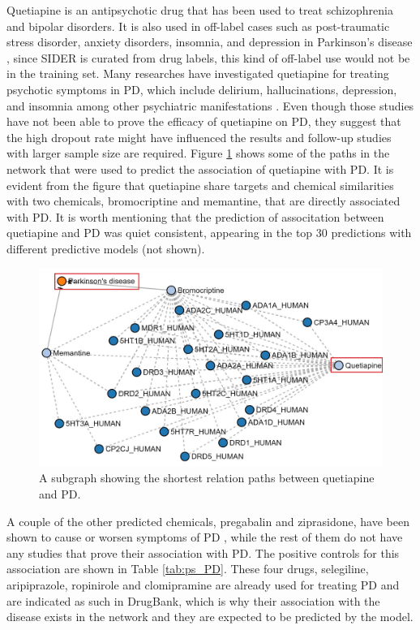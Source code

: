 Quetiapine is an antipsychotic drug that has been used to treat schizophrenia and bipolar disorders. It is also used in off-label cases such as post-traumatic stress disorder, anxiety disorders, insomnia, and depression in Parkinson’s disease \cite{el-saifi_quetiapine_2016}, since SIDER is curated from drug labels, this kind of off-label use would not be in the training set. Many researches have investigated quetiapine for treating psychotic symptoms in \ac{PD}, which include delirium, hallucinations, depression, and insomnia among other psychiatric manifestations \cite{desmarais_quetiapine_2016}. Even though those studies have not been able to prove the efficacy of quetiapine on \ac{PD}, they suggest that the high dropout rate might have influenced the results and follow-up studies with larger sample size are required. Figure \ref{fig:parkinson_quetiapine} shows some of the paths in the network that were used to predict the association of quetiapine with \ac{PD}. It is evident from the figure that quetiapine share targets and chemical similarities with two chemicals, bromocriptine and memantine, that are directly associated with \ac{PD}. It is worth mentioning that the prediction of associtation between quetiapine and \ac{PD} was quiet consistent, appearing in the top 30 predictions with different predictive models (not shown). 

\begin{figure}[h!]
    \centering
    \includegraphics[scale=0.6]
    {figures/parkinson_quetiapine.jpg}
    \caption[Quetiapine-PD path subgraph]{\label{fig:parkinson_quetiapine} A subgraph showing the shortest relation paths between quetiapine and \ac{PD}.}
\end{figure}

A couple of the other predicted chemicals, pregabalin and ziprasidone, have been shown to cause or worsen symptoms of \ac{PD} \cite{perez_lloret_pregabalin-induced_2009, younce_systematic_2019}, while the rest of them do not have any studies that prove their association with \ac{PD}. The positive controls for this association are shown in Table \ref{tab:ps_PD}. These four drugs, selegiline, aripiprazole, ropinirole and clomipramine are already used for treating \ac{PD} and are indicated as such in DrugBank, which is why their association with the disease exists in the network and they are expected to be predicted by the model.

